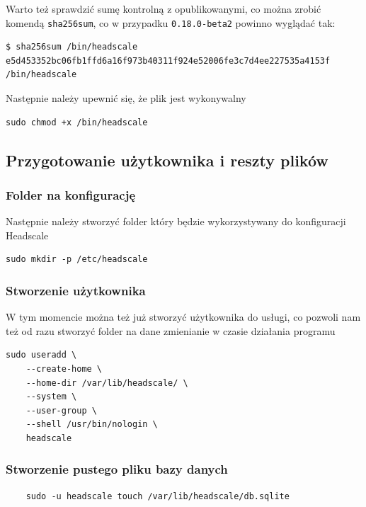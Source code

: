 \documentclass[../main.tex]{subfiles}
\begin{document}
Warto też sprawdzić sumę kontrolną z opublikowanymi, co można zrobić komendą \texttt{sha256sum}, co w przypadku \texttt{0.18.0-beta2} powinno wyglądać tak:

\begin{verbatim}
$ sha256sum /bin/headscale
e5d453352bc06fb1ffd6a16f973b40311f924e52006fe3c7d4ee227535a4153f  /bin/headscale
\end{verbatim}

Następnie należy upewnić się, że plik jest wykonywalny

\begin{verbatim}
sudo chmod +x /bin/headscale
\end{verbatim}

\subsection{Przygotowanie użytkownika i reszty plików}

\subsubsection{Folder na konfigurację}

Następnie należy stworzyć folder który będzie wykorzystywany do konfiguracji Headscale

\begin{verbatim}
sudo mkdir -p /etc/headscale
\end{verbatim}

\subsubsection{Stworzenie użytkownika}

W tym momencie można też już stworzyć użytkownika do usługi, co pozwoli nam też od razu stworzyć folder na dane zmienianie w czasie działania programu
\begin{verbatim}
sudo useradd \
	--create-home \
	--home-dir /var/lib/headscale/ \
	--system \
	--user-group \
	--shell /usr/bin/nologin \
	headscale    
\end{verbatim}

\subsubsection{Stworzenie pustego pliku bazy danych}

\begin{verbatim}
    sudo -u headscale touch /var/lib/headscale/db.sqlite
\end{verbatim}
\end{document}
